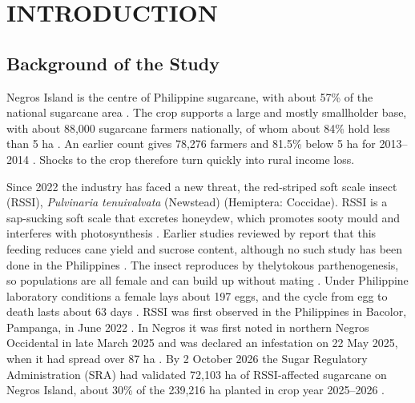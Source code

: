 \section{INTRODUCTION}

\subsection{Background of the Study}

Negros Island is the centre of Philippine sugarcane, with about 57\% of the national sugarcane area \citep{PCAARRDnd}. The crop supports a large and mostly smallholder base, with about 88,000 sugarcane farmers nationally, of whom about 84\% hold less than 5 ha \citep{PCAARRDnd}. An earlier count gives 78,276 farmers and 81.5\% below 5 ha for 2013--2014 \citep{Briones2020}. Shocks to the crop therefore turn quickly into rural income loss.

Since 2022 the industry has faced a new threat, the red-striped soft scale insect (RSSI), \emph{Pulvinaria tenuivalvata} (Newstead) (Hemiptera: Coccidae). RSSI is a sap-sucking soft scale that excretes honeydew, which promotes sooty mould and interferes with photosynthesis \citep{Guerrero2026}. Earlier studies reviewed by \citet{Guerrero2026} report that this feeding reduces cane yield and sucrose content, although no such study has been done in the Philippines \citep{Guerrero2024}. The insect reproduces by thelytokous parthenogenesis, so populations are all female and can build up without mating \citep{Guerrero2026}. Under Philippine laboratory conditions a female lays about 197 eggs, and the cycle from egg to death lasts about 63 days \citep{Guerrero2026}. RSSI was first observed in the Philippines in Bacolor, Pampanga, in June 2022 \citep{Navasero2023}. In Negros it was first noted in northern Negros Occidental in late March 2025 and was declared an infestation on 22 May 2025, when it had spread over 87 ha \citep{ManilaBulletin2025}. By 2 October 2026 the Sugar Regulatory Administration (SRA) had validated 72,103 ha of RSSI-affected sugarcane on Negros Island, about 30\% of the 239,216 ha planted in crop year 2025--2026 \citep{SRA2026FOI}.

